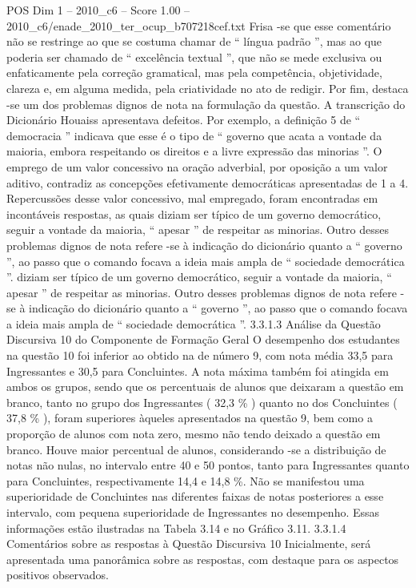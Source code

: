 \begin{textsample}{POS Dim 1 – 2010\_c6 – Score 1.00 – 2010\_c6/enade\_2010\_ter\_ocup\_b707218cef.txt}
Frisa -se que esse comentário não se restringe ao que se costuma chamar de “ língua padrão ”, mas ao que poderia ser chamado de “ excelência textual ”, que não se mede exclusiva ou enfaticamente pela correção gramatical, mas pela competência, objetividade, clareza e, em alguma medida, pela criatividade no ato de redigir.
Por fim, destaca -se um dos problemas dignos de nota na formulação da questão.
A transcrição do Dicionário Houaiss apresentava defeitos.
Por exemplo, a definição 5 de “ democracia ” indicava que esse é o tipo de “ governo que acata a vontade da maioria, embora respeitando os direitos e a livre expressão das minorias ”.
O emprego de um valor concessivo na oração adverbial, por oposição a um valor aditivo, contradiz as concepções efetivamente democráticas apresentadas de 1 a 4.
Repercussões desse valor concessivo, mal empregado, foram encontradas em incontáveis respostas, as quais diziam ser típico de um governo democrático, seguir a vontade da maioria, “ apesar ” de respeitar as minorias.
Outro desses problemas dignos de nota refere -se à indicação do dicionário quanto a “ governo ”, ao passo que o comando focava a ideia mais ampla de “ sociedade democrática ”. diziam ser típico de um governo democrático, seguir a vontade da maioria, “ apesar ” de respeitar as minorias.
Outro desses problemas dignos de nota refere -se à indicação do dicionário quanto a “ governo ”, ao passo que o comando focava a ideia mais ampla de “ sociedade democrática ”. 3.3.1.3 Análise da Questão Discursiva 10 do Componente de Formação Geral O desempenho dos estudantes na questão 10 foi inferior ao obtido na de número 9, com nota média 33,5 para Ingressantes e 30,5 para Concluintes.
A nota máxima também foi atingida em ambos os grupos, sendo que os percentuais de alunos que deixaram a questão em branco, tanto no grupo dos Ingressantes ( 32,3 \% ) quanto no dos Concluintes ( 37,8 \% ), foram superiores àqueles apresentados na questão 9, bem como a proporção de alunos com nota zero, mesmo não tendo deixado a questão em branco.
Houve maior percentual de alunos, considerando -se a distribuição de notas não nulas, no intervalo entre 40 e 50 pontos, tanto para Ingressantes quanto para Concluintes, respectivamente 14,4 e 14,8 \%.
Não se manifestou uma superioridade de Concluintes nas diferentes faixas de notas posteriores a esse intervalo, com pequena superioridade de Ingressantes no desempenho.
Essas informações estão ilustradas na Tabela 3.14 e no Gráfico 3.11. 3.3.1.4 Comentários sobre as respostas à Questão Discursiva 10 Inicialmente, será apresentada uma panorâmica sobre as respostas, com destaque para os aspectos positivos observados.

\end{textsample}
